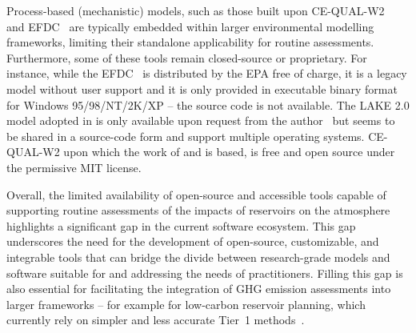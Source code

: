 \documentclass[final,1p,times]{elsarticle}
\begin{document}
Process-based (mechanistic) models, such as those built upon CE-QUAL-W2~\citep{Berger2014} and \acf{EFDC}~\citep{SHI2025} are typically embedded within larger environmental modelling frameworks, limiting their standalone applicability for routine assessments. 
Furthermore, some of these tools remain closed-source or proprietary. 
For instance, while the \ac{EFDC}~\cite{hamrick1992} is distributed by the \ac{EPA} free of charge, it is a legacy model without user support and it is only provided in executable binary format for Windows 95/98/NT/2K/XP -- the source code is not available.
The LAKE 2.0 model adopted in \cite{Lomov2024} is only available upon request from the author~\cite{Stepanenko2016} but seems to be shared in a source-code form and support multiple operating systems.
CE-QUAL-W2 upon which the work of \citet{Berger2014} and \citet{Wu2022} is based, is free and open source under the permissive MIT license.

Overall, the limited availability of open-source and accessible tools capable of supporting routine assessments of the impacts of reservoirs on the atmosphere highlights a significant gap in the current software ecosystem. 
This gap underscores the need for the development of open-source, customizable, and integrable tools that can bridge the divide between research-grade models and software suitable for and addressing the needs of practitioners. 
Filling this gap is also essential for facilitating the integration of \ac{GHG} emission assessments into larger frameworks -- for example for low-carbon reservoir planning, which currently rely on simpler and less accurate Tier~1 methods~\cite{Almeida2019, Carlino2024, Tangi2024}.
\end{document}
